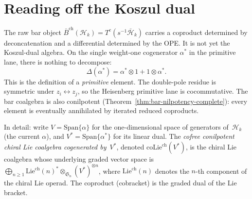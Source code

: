 \section{Reading off the Koszul dual}\label{sec:frame-koszul-dual}

The raw bar object
$\bar{B}^{\mathrm{ch}}(\mathcal{H}_k)=
T^c(s^{-1}\bar{\mathcal H}_k)$ carries a coproduct determined by
deconcatenation and a differential determined by the OPE. It is
not yet the Koszul-dual algebra. On the single weight-one
cogenerator $\alpha^*$ in the primitive lane, there is nothing
to decompose:
\begin{equation}\label{eq:frame-primitive}
\Delta(\alpha^*) = \alpha^* \otimes 1 + 1 \otimes \alpha^*.
\end{equation}
This is the definition of a \emph{primitive} element.
The double-pole residue is symmetric under
$z_i \leftrightarrow z_j$, so the Heisenberg primitive lane is
cocommutative.
The bar coalgebra is also conilpotent
(Theorem~\ref{thm:bar-nilpotency-complete}): every element
is eventually annihilated by iterated reduced coproducts.

In detail:
write $V = \mathrm{Span}\{\alpha\}$ for the one-dimensional
space of generators of~$\mathcal{H}_k$ (the current $\alpha$),
and $V^* = \mathrm{Span}\{\alpha^*\}$ for its linear dual.
The \emph{cofree conilpotent chiral Lie coalgebra
cogenerated by~$V^*$}, denoted
$\mathrm{coLie}^{\mathrm{ch}}(V^*)$, is the chiral Lie
coalgebra whose underlying graded vector space is
$\bigoplus_{n \geq 1} \mathrm{Lie}^{\mathrm{ch}}(n)^*
\otimes_{\mathfrak{S}_n} (V^*)^{\otimes n}$, where
$\mathrm{Lie}^{\mathrm{ch}}(n)$ denotes the $n$-th component
of the chiral Lie operad. The coproduct (cobracket)
is the graded dual of the Lie bracket.

